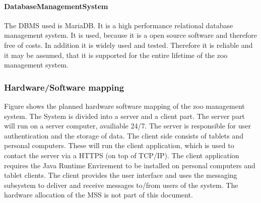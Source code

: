 			\paragraph{DatabaseManagementSystem}
				The DBMS used is MariaDB. It is a high performance relational database management system. It is used, because it is a open source software and therefore free of costs. In addition it is widely used and tested. Therefore it is reliable and it may be assumed, that it is supported for the entire lifetime of the zoo management system.

		\subsubsection{Hardware/Software mapping}
			Figure shows the planned hardware software mapping of the zoo management system. The System is divided into a server and a client part. The server part will run on a server computer, availiable 24/7. The server is responsible for user authentication and the storage of data. The client side consists of tablets and personal computers. These will run the client application, which is used to contact the server via a HTTPS (on top of TCP/IP). The client application requires the Java Runtime Envirement to be installed on personal computers and tablet clients. The client provides the user interface and uses the messaging subsystem to deliver and receive messages to/from users of the system. The hardware allocation of the MSS is not part of this document.

